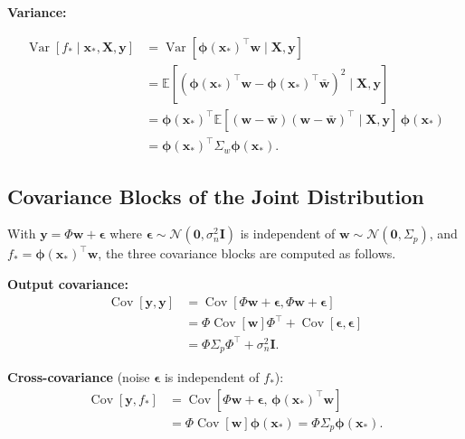 \documentclass[
  letterpaper,
  DIV=11,
  numbers=noendperiod]{scrartcl}
\begin{document}
\textbf{Variance:}

\[
\begin{aligned}
\operatorname{Var}[f_* \mid \mathbf{x}_*, \mathbf{X}, \mathbf{y}]
&= \operatorname{Var}[\boldsymbol{\phi}(\mathbf{x}_*)^\top \mathbf{w} \mid \mathbf{X}, \mathbf{y}] \\
&= \mathbb{E}[(\boldsymbol{\phi}(\mathbf{x}_*)^\top \mathbf{w} - \boldsymbol{\phi}(\mathbf{x}_*)^\top \bar{\mathbf{w}})^2 \mid \mathbf{X}, \mathbf{y}] \\
&= \boldsymbol{\phi}(\mathbf{x}_*)^\top \mathbb{E}[(\mathbf{w} - \bar{\mathbf{w}})(\mathbf{w} - \bar{\mathbf{w}})^\top \mid \mathbf{X}, \mathbf{y}]\, \boldsymbol{\phi}(\mathbf{x}_*) \\
&= \boldsymbol{\phi}(\mathbf{x}_*)^\top \Sigma_w \boldsymbol{\phi}(\mathbf{x}_*).
\end{aligned}
\]

\subsection{Covariance Blocks of the Joint
Distribution}\label{sec-covariance-blocks}

With \(\mathbf{y} = \Phi\mathbf{w} + \boldsymbol{\epsilon}\) where
\(\boldsymbol{\epsilon} \sim \mathcal{N}(\mathbf{0}, \sigma_n^2\mathbf{I})\)
is independent of \(\mathbf{w} \sim \mathcal{N}(\mathbf{0}, \Sigma_p)\),
and \(f_* = \boldsymbol{\phi}(\mathbf{x}_*)^\top \mathbf{w}\), the three
covariance blocks are computed as follows.

\textbf{Output covariance:} \[
\begin{aligned}
\operatorname{Cov}[\mathbf{y}, \mathbf{y}] &= \operatorname{Cov}[\Phi\mathbf{w} + \boldsymbol{\epsilon}, \Phi\mathbf{w} + \boldsymbol{\epsilon}] \\
&= \Phi\operatorname{Cov}[\mathbf{w}]\Phi^\top + \operatorname{Cov}[\boldsymbol{\epsilon}, \boldsymbol{\epsilon}] \\
&= \Phi\Sigma_p\Phi^\top + \sigma_n^2\mathbf{I}.
\end{aligned}
\]

\textbf{Cross-covariance} (noise \(\boldsymbol{\epsilon}\) is
independent of \(f_*\)): \[
\begin{aligned}
\operatorname{Cov}[\mathbf{y}, f_*] &= \operatorname{Cov}[\Phi\mathbf{w} + \boldsymbol{\epsilon},\, \boldsymbol{\phi}(\mathbf{x}_*)^\top \mathbf{w}] \\
&= \Phi\operatorname{Cov}[\mathbf{w}]\boldsymbol{\phi}(\mathbf{x}_*) = \Phi\Sigma_p\boldsymbol{\phi}(\mathbf{x}_*).
\end{aligned}
\]
\end{document}

